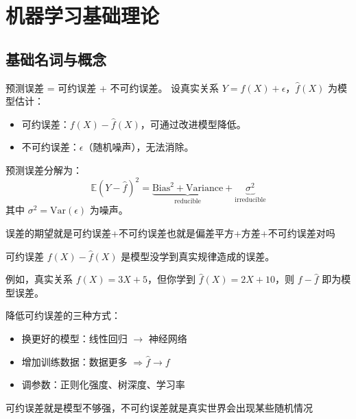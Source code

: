 \chapter{机器学习基础理论}
\section{基础名词与概念}
\begin{definition}[可约误差与不可约误差]
预测误差 = 可约误差 + 不可约误差。
设真实关系 $Y = f(X) + \epsilon$，$\hat f(X)$ 为模型估计：
\begin{itemize}
  \item 可约误差：$f(X) - \hat f(X)$，可通过改进模型降低。
  \item 不可约误差：$\epsilon$（随机噪声），无法消除。
\end{itemize}
\end{definition}
\begin{note}
预测误差分解为：
\[
\mathbb{E}(Y-\hat f)^2 = \underbrace{\text{Bias}^2 + \text{Variance}}_{\text{reducible}} + \underbrace{\sigma^2}_{\text{irreducible}}
\]
其中 $\sigma^2 = \text{Var}(\epsilon)$ 为噪声。
\end{note}
\begin{dxtips}
    误差的期望就是可约误差+不可约误差也就是偏差平方+方差+不可约误差对吗
\end{dxtips}
\begin{example}[可约误差]
可约误差 $f(X) - \hat f(X)$ 是模型没学到真实规律造成的误差。

例如，真实关系 $f(X)=3X+5$，但你学到 $\hat f(X)=2X+10$，则 $f-\hat f$ 即为模型误差。

降低可约误差的三种方式：
\begin{itemize}
  \item 换更好的模型：线性回归 $\to$ 神经网络
  \item 增加训练数据：数据更多 $\Rightarrow \hat f \to f$
  \item 调参数：正则化强度、树深度、学习率
\end{itemize}


\end{example}
\begin{dxtips}
    可约误差就是模型不够强，不可约误差就是真实世界会出现某些随机情况
\end{dxtips}

